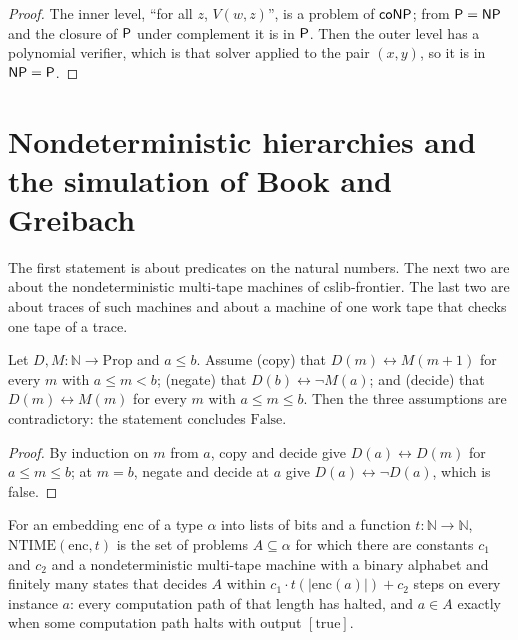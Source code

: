 \begin{proof}
  \leanok
  The inner level, ``for all $z$, $V(w, z)$'', is a problem of $\mathsf{coNP}$; from $\mathsf{P} = \mathsf{NP}$ and the closure of
  $\mathsf{P}$ under complement it is in $\mathsf{P}$. Then the outer level has a polynomial verifier, which is that
  solver applied to the pair $(x, y)$, so it is in $\mathsf{NP} = \mathsf{P}$.
\end{proof}

\section{Nondeterministic hierarchies and the simulation of Book and Greibach}
\label{sec:machines-hierarchy}

The first statement is about predicates on the natural numbers. The next two are about the nondeterministic
multi-tape machines of cslib-frontier. The last two are about traces of such machines and about a machine of
one work tape that checks one tape of a trace.

\begin{theorem}
  \label{thm:machines-lazy-diagonal}
  \leanok
  Let $D, M : \mathbb{N} \to \mathrm{Prop}$ and $a \le b$. Assume (copy) that $D(m) \leftrightarrow M(m + 1)$
  for every $m$ with $a \le m < b$; (negate) that $D(b) \leftrightarrow \lnot M(a)$; and (decide) that
  $D(m) \leftrightarrow M(m)$ for every $m$ with $a \le m \le b$. Then the three assumptions are
  contradictory: the statement concludes $\mathrm{False}$.
\end{theorem}

\begin{proof}
  \leanok
  By induction on $m$ from $a$, copy and decide give $D(a) \leftrightarrow D(m)$ for $a \le m \le b$; at
  $m = b$, negate and decide at $a$ give $D(a) \leftrightarrow \lnot D(a)$, which is false.
\end{proof}

\begin{definition}
  \label{def:machines-cslib-ntime}
  \leanok
  For an embedding $\mathrm{enc}$ of a type $\alpha$ into lists of bits and a function $t : \mathbb{N} \to \mathbb{N}$,
  $\mathrm{NTIME}(\mathrm{enc}, t)$ is the set of problems $A \subseteq \alpha$ for which there are constants
  $c_1$ and $c_2$ and a nondeterministic multi-tape machine with a binary alphabet and finitely many states
  that decides $A$ within $c_1 \cdot t(|\mathrm{enc}(a)|) + c_2$ steps on every instance $a$: every
  computation path of that length has halted, and $a \in A$ exactly when some computation path halts with
  output $[\mathrm{true}]$.
\end{definition}

